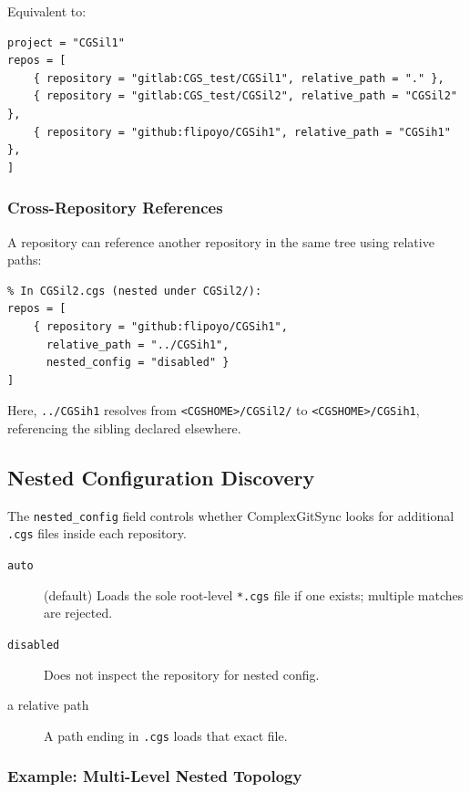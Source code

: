Equivalent to:

\begin{lstlisting}
project = "CGSil1"
repos = [
    { repository = "gitlab:CGS_test/CGSil1", relative_path = "." },
    { repository = "gitlab:CGS_test/CGSil2", relative_path = "CGSil2" },
    { repository = "github:flipoyo/CGSih1", relative_path = "CGSih1" },
]
\end{lstlisting}

\subsubsection{Cross-Repository References}

A repository can reference another repository in the same tree using relative paths:

\begin{lstlisting}
% In CGSil2.cgs (nested under CGSil2/):
repos = [
    { repository = "github:flipoyo/CGSih1", 
      relative_path = "../CGSih1", 
      nested_config = "disabled" }
]
\end{lstlisting}

Here, \texttt{../CGSih1} resolves from \texttt{<CGSHOME>/CGSil2/} to
\texttt{<CGSHOME>/CGSih1}, referencing the sibling declared elsewhere.

\subsection{Nested Configuration Discovery}
\label{subsec:cgs-nested}

The \texttt{nested\_config} field controls whether ComplexGitSync looks for
additional \texttt{.cgs} files inside each repository.

\begin{description}
  \item[\texttt{auto}] (default) Loads the sole root-level \texttt{*.cgs} file if
        one exists; multiple matches are rejected.
  \item[\texttt{disabled}] Does not inspect the repository for nested config.
  \item[a relative path] A path ending in \texttt{.cgs} loads that exact file.
\end{description}

\subsubsection{Example: Multi-Level Nested Topology}

